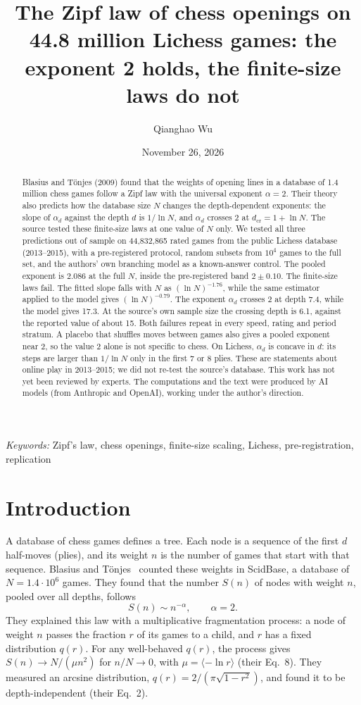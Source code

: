 \documentclass[11pt]{article}
\title{The Zipf law of chess openings on 44.8 million Lichess games: the exponent 2 holds, the finite-size laws do not}
\author{Qianghao Wu}
\date{November 26, 2026}
\begin{document}
\maketitle
\begin{abstract}
Blasius and T\"onjes (2009) found that the weights of opening lines in a database of 1.4 million chess games follow a Zipf law with the universal exponent $\alpha=2$. Their theory also predicts how the database size $N$ changes the depth-dependent exponents: the slope of $\alpha_d$ against the depth $d$ is $1/\ln N$, and $\alpha_d$ crosses 2 at $d_{\mathrm{cr}}=1+\ln N$. The source tested these finite-size laws at one value of $N$ only. We tested all three predictions out of sample on 44,832,865 rated games from the public Lichess database (2013--2015), with a pre-registered protocol, random subsets from $10^4$ games to the full set, and the authors' own branching model as a known-answer control. The pooled exponent is 2.086 at the full $N$, inside the pre-registered band $2\pm0.10$. The finite-size laws fail. The fitted slope falls with $N$ as $(\ln N)^{-1.76}$, while the same estimator applied to the model gives $(\ln N)^{-0.79}$. The exponent $\alpha_d$ crosses 2 at depth 7.4, while the model gives 17.3. At the source's own sample size the crossing depth is 6.1, against the reported value of about 15. Both failures repeat in every speed, rating and period stratum. A placebo that shuffles moves between games also gives a pooled exponent near 2, so the value 2 alone is not specific to chess. On Lichess, $\alpha_d$ is concave in $d$: its steps are larger than $1/\ln N$ only in the first 7 or 8 plies. These are statements about online play in 2013--2015; we did not re-test the source's database. This work has not yet been reviewed by experts. The computations and the text were produced by AI models (from Anthropic and OpenAI), working under the author's direction.
\end{abstract}
\medskip
\noindent\textit{Keywords:} Zipf's law, chess openings, finite-size scaling, Lichess, pre-registration, replication

\section{Introduction}
A database of chess games defines a tree. Each node is a sequence of the first $d$ half-moves (plies), and its weight $n$ is the number of games that start with that sequence. Blasius and T\"onjes~\cite{bt} counted these weights in ScidBase, a database of $N=1.4\cdot10^6$ games. They found that the number $S(n)$ of nodes with weight $n$, pooled over all depths, follows
\begin{equation}
S(n)\sim n^{-\alpha},\qquad \alpha=2. \label{eq:zipf}
\end{equation}
They explained this law with a multiplicative fragmentation process: a node of weight $n$ passes the fraction $r$ of its games to a child, and $r$ has a fixed distribution $q(r)$. For any well-behaved $q(r)$, the process gives $S(n)\to N/(\mu n^2)$ for $n/N\to0$, with $\mu=\langle-\ln r\rangle$ (their Eq.~8). They measured an arcsine distribution, $q(r)=2/(\pi\sqrt{1-r^2})$, and found it to be depth-independent (their Eq.~2).
\end{document}
